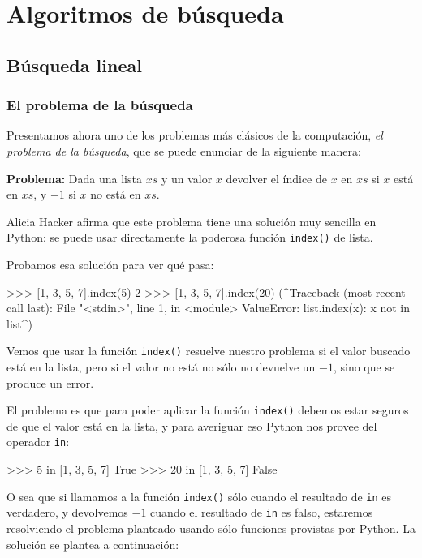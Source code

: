 \chapter{Algoritmos de búsqueda}

\section{Búsqueda lineal}

\subsection*{El problema de la búsqueda}

Presentamos ahora uno de los problemas más clásicos de la computación, \emph{el
problema de la búsqueda}, que se puede enunciar de la siguiente manera:

{\bf Problema: } Dada una lista $xs$ y un valor $x$ devolver el índice de $x$
en $xs$ si $x$ está en $xs$, y $-1$ si $x$ no está en $xs$.

Alicia Hacker afirma que este problema tiene una solución muy sencilla en
Python: se puede usar directamente la poderosa función \lstinline+index()+ de
lista.

Probamos esa solución para ver qué pasa:

\begin{codigo-python-sn}
>>> [1, 3, 5, 7].index(5)
2
>>> [1, 3, 5, 7].index(20)
(^Traceback (most recent call last):
  File "<stdin>", line 1, in <module>
ValueError: list.index(x): x not in list^)
\end{codigo-python-sn}

Vemos que usar la función \lstinline+index()+ resuelve nuestro problema si el
valor buscado está en la lista, pero si el valor no está no sólo no devuelve
un $-1$, sino que se produce un error.

El problema es que para poder aplicar la función \lstinline+index()+ debemos
estar seguros de que el valor está en la lista, y para averiguar eso Python
nos provee del operador \lstinline+in+:

\begin{codigo-python-sn}
>>> 5 in [1, 3, 5, 7]
True
>>> 20 in [1, 3, 5, 7]
False
\end{codigo-python-sn}

O sea que si llamamos a la función \lstinline+index()+ sólo cuando el
resultado de \lstinline+in+ es verdadero, y devolvemos $-1$ cuando el
resultado de \lstinline+in+ es falso, estaremos resolviendo el problema
planteado usando sólo funciones provistas por Python. La solución se plantea a
continuación:

